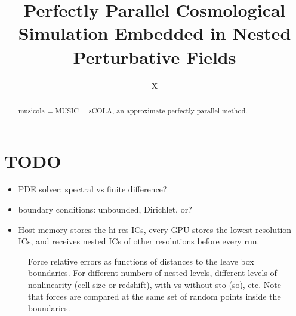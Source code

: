 \documentclass[modern, trackchanges, dvipsnames]{aastex631}
\newcommand{\gkai}[1]{\begin{CJK*}{UTF8}{gkai}\raisebox{.1em}{(}#1\raisebox{.1em}{)}\end{CJK*}}
\begin{document}
\title{\large Perfectly Parallel Cosmological Simulation Embedded in Nested Perturbative Fields
\vspace{0.3em}}


\author[0000-0000-0000-0000]{\normalsize X}
%
%
%







\begin{abstract}

musicola = MUSIC + sCOLA, an approximate perfectly parallel method.

\end{abstract}



\section*{TODO}
\begin{itemize}
\item PDE solver: spectral vs finite difference?
\item boundary conditions: unbounded, Dirichlet, or?
\item Host memory stores the hi-res ICs, every GPU stores the lowest
  resolution ICs, and receives nested ICs of other resolutions before
  every run.
\end{itemize}


\begin{figure*}[tb]
\centering
\caption{Force relative errors as functions of distances to the leave
box boundaries. For different numbers of nested levels, different levels
of nonlinearity (cell size or redshift), with vs without sto (so), etc.
Note that forces are compared at the same set of random points inside
the boundaries.}
\label{fig:error}
\end{figure*}
\end{document}
